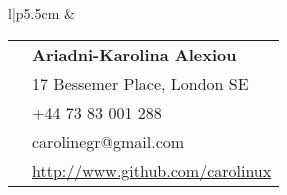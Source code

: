 \documentclass[10pt]{article} %
\begin{document}
\begin{minipage}[t]{0.44\textwidth} %
\vspace{0pt} %


\colorbox{shade}{\textcolor{text1}{
        \begin{tabular}{l|p{5.5cm}}
            \raisebox{-1.25cm}{} &
        \begin{tabular}{l|p{5cm}}
    \raisebox{0pt}{\Smiley} & \textbf{Ariadni-Karolina Alexiou} \\ %
            \raisebox{-1pt}{\textifsymbol{18}}& 17 Bessemer Place, London SE \\ %
            \raisebox{-1pt}{\Mobilefone} & +44 73 83 001 288\\ %
    \raisebox{-1pt}{\Letter} & carolinegr@gmail.com \\ %
    \Keyboard & \href{http://www.github.com/carolinux}{http://www.github.com/carolinux} \\ %
        \end{tabular}  \\ %
\end{tabular}
}
}\\[10pt]









\end{minipage}
\end{document}
